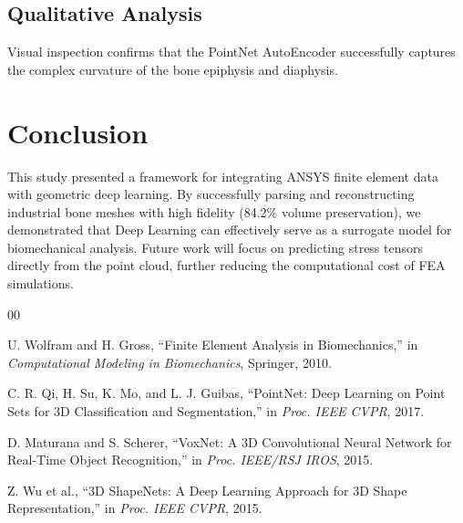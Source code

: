 \documentclass[conference]{IEEEtran}
\begin{document}
\subsection{Qualitative Analysis}
Visual inspection confirms that the PointNet AutoEncoder successfully captures the complex curvature of the bone epiphysis and diaphysis.


\section{Conclusion}
This study presented a framework for integrating ANSYS finite element data with geometric deep learning. By successfully parsing and reconstructing industrial bone meshes with high fidelity (84.2\% volume preservation), we demonstrated that Deep Learning can effectively serve as a surrogate model for biomechanical analysis. Future work will focus on predicting stress tensors directly from the point cloud, further reducing the computational cost of FEA simulations.

\begin{thebibliography}{00}

 U. Wolfram and H. Gross, ``Finite Element Analysis in Biomechanics,'' in \textit{Computational Modeling in Biomechanics}, Springer, 2010.

 C. R. Qi, H. Su, K. Mo, and L. J. Guibas, ``PointNet: Deep Learning on Point Sets for 3D Classification and Segmentation,'' in \textit{Proc. IEEE CVPR}, 2017.

 D. Maturana and S. Scherer, ``VoxNet: A 3D Convolutional Neural Network for Real-Time Object Recognition,'' in \textit{Proc. IEEE/RSJ IROS}, 2015.

 Z. Wu et al., ``3D ShapeNets: A Deep Learning Approach for 3D Shape Representation,'' in \textit{Proc. IEEE CVPR}, 2015.

\end{thebibliography}
\end{document}
